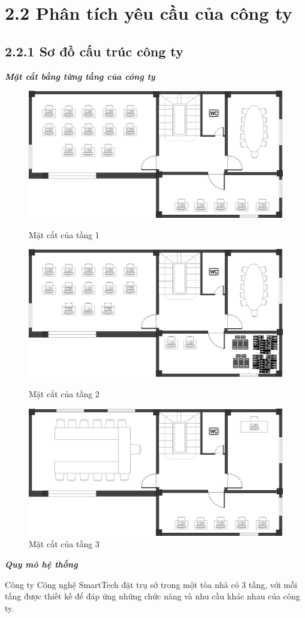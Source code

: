 \section*{2.2 Phân tích yêu cầu của công ty}

\subsection*{2.2.1 Sơ đồ cấu trúc công ty}

\textbf{\textit{Mặt cắt bằng từng tầng của công ty}}

\begin{figure}[htbp]
    \centering
    \includegraphics[width=0.6\linewidth]{img/floor1.png}
    \caption{Mặt cắt của tầng 1}
    \vspace{1cm}
    \includegraphics[width=0.6\linewidth]{img/floor2.png}
    \caption{Mặt cắt của tầng 2}
    \vspace{1cm}
     \includegraphics[width=0.6\linewidth]{img/floor3.png}
    \caption{Mặt cắt của tầng 3}
\end{figure}
\newpage
\textbf{\textit{Quy mô hệ thống}}  

Công ty Công nghệ SmartTech đặt trụ sở trong một tòa nhà có 3 tầng, với mỗi tầng được thiết kế để đáp ứng những chức năng và nhu cầu khác nhau của công ty.
 

